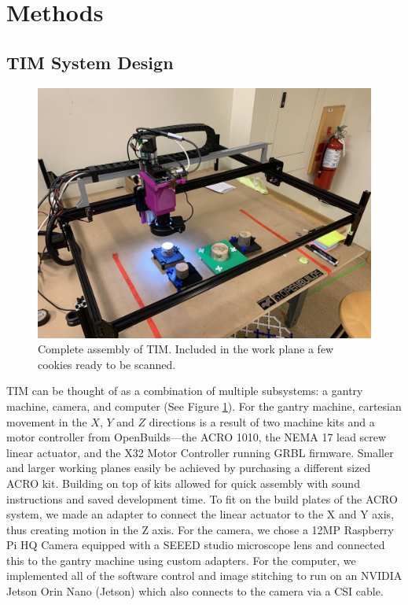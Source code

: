 \documentclass[a4paper,12pt]{article}
\begin{document}
\section{Methods}

\subsection{TIM System Design} %

\begin{figure}
  \centering
  \includegraphics[height=0.5\linewidth]{../content/tina.jpg}
  \caption{Complete assembly of TIM. Included in the work plane a few cookies ready to be scanned.}
  \label{fig:tim_assembled}
\end{figure}

TIM can be thought of as a combination of multiple subsystems: a gantry machine, camera, and computer (See Figure \ref{fig:tim_assembled}). 
For the gantry machine, cartesian movement in the $X$, $Y$ and $Z$ directions is a result of two machine kits and a motor controller from OpenBuilds---the ACRO 1010, the NEMA 17 lead screw linear actuator, and the X32 Motor Controller running GRBL firmware. 
Smaller and larger working planes easily be achieved by purchasing a different sized ACRO kit.
Building on top of kits allowed for quick assembly with sound instructions and saved development time. 
To fit on the build plates of the ACRO system, we made an adapter to connect the linear actuator to the X and Y axis, thus creating motion in the Z axis.
For the camera, we chose a 12MP Raspberry Pi HQ Camera equipped with a SEEED studio microscope lens and connected this to the gantry machine using custom adapters.
For the computer, we implemented all of the software control and image stitching to run on an NVIDIA Jetson Orin Nano (Jetson) which also connects to the camera via a CSI cable.
\end{document}

